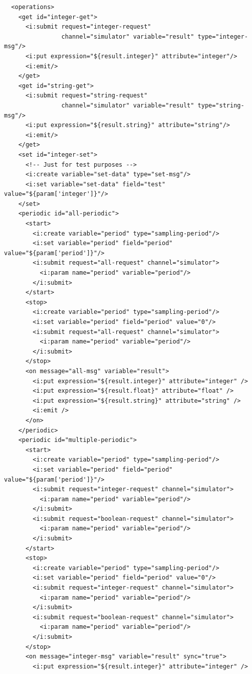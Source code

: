 \begin{lstlisting}
  <operations>
    <get id="integer-get">
      <i:submit request="integer-request"
                channel="simulator" variable="result" type="integer-msg"/>
      <i:put expression="${result.integer}" attribute="integer"/>
      <i:emit/>
    </get>
    <get id="string-get">
      <i:submit request="string-request"
                channel="simulator" variable="result" type="string-msg"/>
      <i:put expression="${result.string}" attribute="string"/>
      <i:emit/>
    </get>
    <set id="integer-set">
      <!-- Just for test purposes -->
      <i:create variable="set-data" type="set-msg"/>
      <i:set variable="set-data" field="test" value="${param['integer']}"/>
    </set>
    <periodic id="all-periodic">
      <start>
        <i:create variable="period" type="sampling-period"/>
        <i:set variable="period" field="period" value="${param['period']}"/>
        <i:submit request="all-request" channel="simulator">
          <i:param name="period" variable="period"/>
        </i:submit>
      </start>
      <stop>
        <i:create variable="period" type="sampling-period"/>
        <i:set variable="period" field="period" value="0"/>
        <i:submit request="all-request" channel="simulator">
          <i:param name="period" variable="period"/>
        </i:submit>
      </stop>
      <on message="all-msg" variable="result">
        <i:put expression="${result.integer}" attribute="integer" />
        <i:put expression="${result.float}" attribute="float" />
        <i:put expression="${result.string}" attribute="string" />
        <i:emit />
      </on>
    </periodic>
    <periodic id="multiple-periodic">
      <start>
        <i:create variable="period" type="sampling-period"/>
        <i:set variable="period" field="period" value="${param['period']}"/>
        <i:submit request="integer-request" channel="simulator">
          <i:param name="period" variable="period"/>
        </i:submit>
        <i:submit request="boolean-request" channel="simulator">
          <i:param name="period" variable="period"/>
        </i:submit>
      </start>
      <stop>
        <i:create variable="period" type="sampling-period"/>
        <i:set variable="period" field="period" value="0"/>
        <i:submit request="integer-request" channel="simulator">
          <i:param name="period" variable="period"/>
        </i:submit>
        <i:submit request="boolean-request" channel="simulator">
          <i:param name="period" variable="period"/>
        </i:submit>
      </stop>
      <on message="integer-msg" variable="result" sync="true">
        <i:put expression="${result.integer}" attribute="integer" />

\end{lstlisting}
